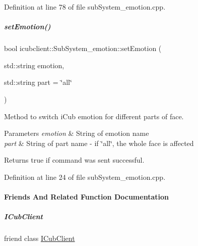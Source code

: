 Definition at line 78 of file sub\+System\+\_\+emotion.\+cpp.

\mbox{\label{group__icubclient__subsystems_ac16bc529539e92565e0bdf957b3e57c2}} 
\subparagraph{\texorpdfstring{set\+Emotion()}{setEmotion()}}
{\footnotesize\ttfamily bool icubclient\+::\+Sub\+System\+\_\+emotion\+::set\+Emotion (\begin{DoxyParamCaption}\item[{std\+::string}]{emotion,  }\item[{std\+::string}]{part = {\ttfamily \char`\"{}all\char`\"{}} }\end{DoxyParamCaption})}



Method to switch i\+Cub emotion for different parts of face. 


\begin{DoxyParams}{Parameters}
{\em emotion} & String of emotion name \\
\hline
{\em part} & String of part name -\/ if \char`\"{}all\char`\"{}, the whole face is affected \\
\hline
\end{DoxyParams}
\begin{DoxyReturn}{Returns}
true if command was sent successful. 
\end{DoxyReturn}


Definition at line 24 of file sub\+System\+\_\+emotion.\+cpp.



\paragraph{Friends And Related Function Documentation}
\mbox{\label{group__icubclient__subsystems_a56c42753f30380d8abf4a96bc322b3b0}} 
\subparagraph{\texorpdfstring{I\+Cub\+Client}{ICubClient}}
{\footnotesize\ttfamily friend class \hyperlink{group__icubclient__clients_classicubclient_1_1ICubClient}{I\+Cub\+Client}\hspace{0.3cm}{\ttfamily [friend]}}




